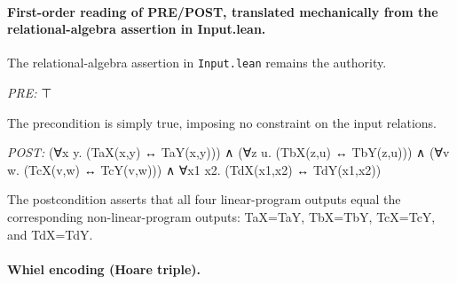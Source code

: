 \documentclass[10pt]{article}
\begin{document}
\paragraph{First-order reading of PRE/POST, translated mechanically from the relational-algebra assertion in Input.lean.} The relational-algebra assertion in \texttt{Input.lean} remains the authority.

\textit{PRE:} ⊤\par The precondition is simply true, imposing no constraint on the input relations.

\textit{POST:} (∀x y. (TaX(x,y) ↔ TaY(x,y))) ∧ (∀z u. (TbX(z,u) ↔ TbY(z,u))) ∧ (∀v w. (TcX(v,w) ↔ TcY(v,w))) ∧ ∀x1 x2. (TdX(x1,x2) ↔ TdY(x1,x2))\par The postcondition asserts that all four linear-program outputs equal the corresponding non-linear-program outputs: TaX=TaY, TbX=TbY, TcX=TcY, and TdX=TdY.

\paragraph{Whiel encoding (Hoare triple).}
\end{document}
